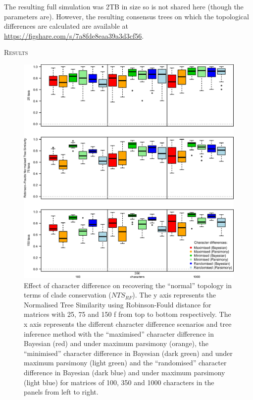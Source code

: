 \documentclass[12pt,letterpaper]{article}
\renewcommand{\section}[1]{%
\bigskip
\begin{center}
\begin{Large}
\normalfont\scshape #1
\medskip
\end{Large}
\end{center}}
\begin{document}
The resulting full simulation was 2TB in size so is not shared here (though the parameters are).
However, the resulting consensus trees on which the topological differences are calculated are available at \url{https://figshare.com/s/7a8fde8eaa39a3d3cf56}.

\section{Results}

\begin{figure}[!htbp]
\centering
   \includegraphics[width=1\textwidth]{RF_results_best.eps}
\caption{\small{Effect of character difference on recovering the ``normal'' topology in terms of clade conservation ($NTS_{RF}$). The y axis represents the Normalised Tree Similarity using Robinson-Fould distance for matrices with 25, 75 and 150 f from top to bottom respectively. The x axis represents the different character difference scenarios and tree inference method with the ``maximised'' character difference in Bayesian (red) and under maximum parsimony (orange), the ``minimised'' character difference in Bayesian (dark green) and under maximum parsimony (light green) and the ``randomised'' character difference in Bayesian (dark blue) and under maximum parsimony (light blue) for matrices of 100, 350 and 1000 characters in the panels from left to right.}}
\label{Fig:RF_results_best}
\end{figure}
\end{document}
